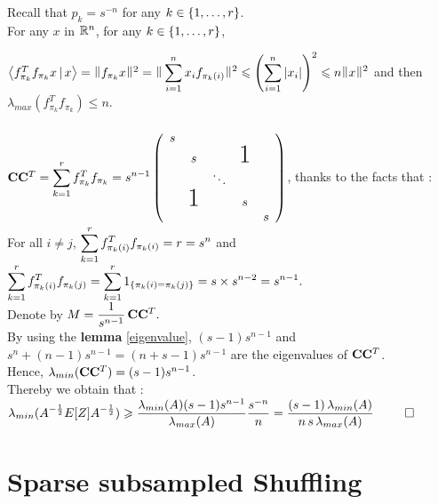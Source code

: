 Recall that $p_{k} = s^{-n}$ for any $k\in \left\{1,\dots,r\right\}$.\\

For any $x$ in ${\mathbb R}^{n}$, for any $k\in \left\{1,\dots,r\right\}$,

$\scal{f_{\pi_{k}}^{T} f_{\pi_{k}} x }{x} = \norm{ f_{\pi_{k}}x }^{2} = \norm{\dsp\sum_{i=1}^{n} x_{i}f_{\pi_{k}(i)} }^{2} \leq \pare{\dsp\sum_{i=1}^{n} \abs{x_{i}}}^{2} \leq n\norm{x}^{2}$
 and then $\lambda_{max}( f_{\pi_{k}}^{T} f_{\pi_{k}}  ) \leq n$.\\\\
 
 
 
$\bold{C} \bold{C}^{T}= \dsp\sum\limits_{k=1}^{r} f_{\pi_{k}}^{T} f_{\pi_{k}} = s^{n-1}
    \left(
    \begin{array}{ccccc}
    s                                    \\
      & s             &   & \text{\huge1}\\
      &               & \ddots               \\
      & \text{\huge1} &   & s            \\
      &               &   &   & s
    \end{array}
    \right)$, thanks to the facts that :\\ For all $i\neq j$, $\displaystyle\sum\limits_{k=1}^{r} f_{\pi_{k}(i)}^{T} f_{\pi_{k}(i)} = r = s^{n}$ and $\displaystyle\sum\limits_{k=1}^{r} f_{\pi_{k}(i)}^{T} f_{\pi_{k}(j)} = \displaystyle\sum\limits_{k=1}^{r} 1_{\left\{\pi_{k}(i) = \pi_{k}(j)\right\}} = s \times s^{n-2} = s^{n-1}.$\\
Denote by $\displaystyle M = \frac{1}{s^{n-1}}\, \bold{C} \bold{C}^{T}.$\\

By using the \textbf{lemma} \ref{eigenvalue}, $(s-1)s^{n-1}$ and $s^{n} + (n-1)s^{n-1} = (n+s-1)s^{n-1}$ are the eigenvalues of $\bold{C} \bold{C}^{T}$.\\
Hence, $\lambda_{min}(\bold{C} \bold{C}^{T}) = (s-1)s^{n-1}$.\\

Thereby we obtain that :\\ 


$\displaystyle \lambda_{min}(A^{-\frac12}E[Z]A^{-\frac12} )  \geqslant  \frac{\lambda_{min}(A) (s-1)s^{n-1}}{ \lambda_{max}(A)}  \frac{s^{-n}}{n} =  \frac{(s-1)\,\lambda_{min}(A)}{n \, s \,\lambda_{max}(A)} $ $\qed$


\chapter{Sparse subsampled Shuffling}

